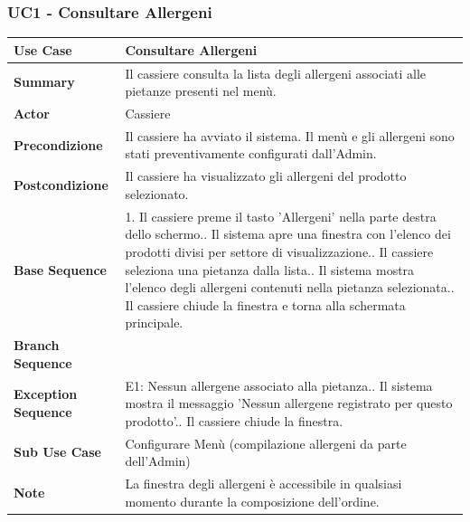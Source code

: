 \subsubsection*{UC1 - Consultare Allergeni}
\begin{center}
\begin{tabular}{|p{}|p{}|}
\hline
\textbf{Use Case} & Consultare Allergeni \\ \hline
\textbf{Summary} & Il cassiere consulta la lista degli allergeni associati alle pietanze presenti nel menù. \\ \hline
\textbf{Actor} & Cassiere \\ \hline
\textbf{Precondizione} & Il cassiere ha avviato il sistema. Il menù e gli allergeni sono stati preventivamente configurati dall'Admin. \\ \hline
\textbf{Postcondizione} & Il cassiere ha visualizzato gli allergeni del prodotto selezionato. \\ \hline
\textbf{Base Sequence} & 1. Il cassiere preme il tasto 'Allergeni' nella parte destra dello schermo.\newline 2. Il sistema apre una finestra con l'elenco dei prodotti divisi per settore di visualizzazione.\newline 3. Il cassiere seleziona una pietanza dalla lista.\newline 4. Il sistema mostra l'elenco degli allergeni contenuti nella pietanza selezionata.\newline 5. Il cassiere chiude la finestra e torna alla schermata principale. \\ \hline
\textbf{Branch Sequence} & \\ \hline
\textbf{Exception Sequence} & E1: Nessun allergene associato alla pietanza.\newline 4. Il sistema mostra il messaggio 'Nessun allergene registrato per questo prodotto'.\newline 5. Il cassiere chiude la finestra. \\ \hline
\textbf{Sub Use Case} & Configurare Menù (compilazione allergeni da parte dell'Admin) \\ \hline
\textbf{Note} & La finestra degli allergeni è accessibile in qualsiasi momento durante la composizione dell'ordine. \\ \hline
\end{tabular}
\end{center}

